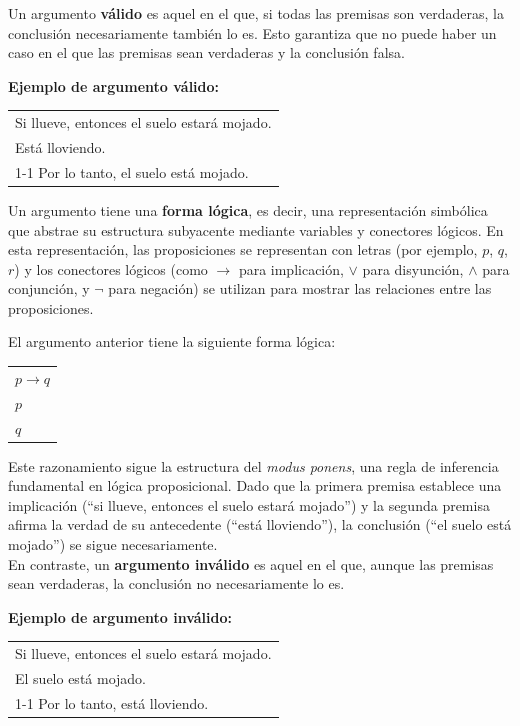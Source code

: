 \begin{tcolorbox}[colback=yellow!20, colframe=black, sharp corners=south]
Un argumento \textbf{válido} es aquel en el que, si todas las premisas son verdaderas, la conclusión necesariamente también lo es. Esto garantiza que no puede haber un caso en el que las premisas sean verdaderas y la conclusión falsa.
\end{tcolorbox}

\bigskip

\textbf{Ejemplo de argumento válido:}
\begin{center}
\begin{tabular}{l}
Si llueve, entonces el suelo estará mojado. \\
Está lloviendo. \\
\cline{1-1}
Por lo tanto, el suelo está mojado.
\end{tabular}
\end{center}


Un argumento tiene una \textbf{forma lógica}, es decir, una representación simbólica que abstrae su estructura subyacente mediante variables y conectores lógicos. En esta representación, las proposiciones se representan con letras (por ejemplo, $p$, $q$, $r$) y los conectores lógicos (como $\rightarrow$ para implicación, $\vee$ para disyunción, $\wedge$ para conjunción, y $\lnot$ para negación) se utilizan para mostrar las relaciones entre las proposiciones.


El argumento anterior tiene la siguiente forma lógica:
\begin{center}
\begin{tabular}{l}
$p \rightarrow q$ \\
$p$ \\
\hline
$q$
\end{tabular}
\end{center}


Este razonamiento sigue la estructura del \textit{modus ponens}, una regla de inferencia fundamental en lógica proposicional. Dado que la primera premisa establece una implicación (``si llueve, entonces el suelo estará mojado'') y la segunda premisa afirma la verdad de su antecedente (``está lloviendo''), la conclusión (``el suelo está mojado'') se sigue necesariamente.\\

En contraste, un \textbf{argumento inválido} es aquel en el que, aunque las premisas sean verdaderas, la conclusión no necesariamente lo es. 

\textbf{Ejemplo de argumento inválido:}
\begin{center}
\begin{tabular}{l}
Si llueve, entonces el suelo estará mojado. \\
El suelo está mojado. \\
\cline{1-1}
Por lo tanto, está lloviendo.
\end{tabular}
\end{center}

